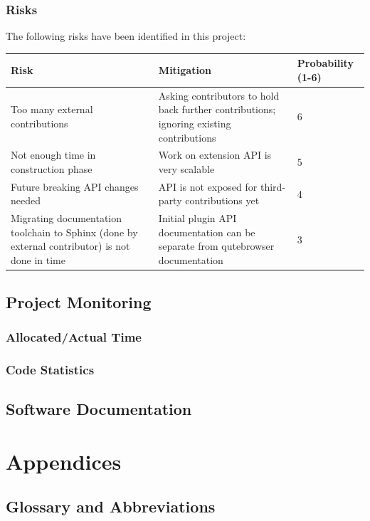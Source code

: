 \documentclass[a4paper,parskip=full]{scrreprt}
\begin{document}
\section{Risks}
The following risks have been identified in this project:

\begin{table}[h!]
  \begin{tabulary}{\linewidth}{LLl}
    \toprule
    Risk & Mitigation & Probability (1-6) \\
    \midrule
    Too many external contributions & Asking contributors to hold back further contributions; ignoring existing contributions & 6 \\
    \hline
    Not enough time in construction phase & Work on extension API is very
    scalable & 5 \\
    \hline
    Future breaking API changes needed & API is not exposed for third-party
    contributions yet & 4 \\
    \hline
    Migrating documentation toolchain to Sphinx (done by external contributor)
    is not done in time & Initial plugin API documentation can be separate from
    qutebrowser documentation & 3 \\
    \bottomrule
  \end{tabulary}
\end{table}

\chapter{Project Monitoring}
\section{Allocated/Actual Time}
\section{Code Statistics}


\chapter{Software Documentation}



\part{Appendices}


\chapter{Glossary and Abbreviations}

\nocite{yapproach}
\renewcommand{\bibname}{\chapter{Literature and Sources}}


\end{document}
